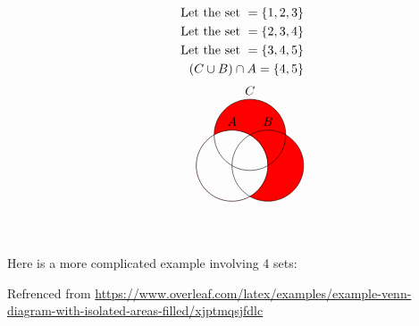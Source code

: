 \documentclass{article}
\def\exp{
    \begin{tikzpicture}
        \begin{scope} [fill opacity = .0]
            \draw[fill=green, draw = black] (-0.5,1) circle (1);
            \draw[fill=blue, draw = black] (0.5,1) circle (1);
            \draw[fill=red, draw = black] (0,0) circle (1);
            \node at (-0.9,1.4) {$\mathbf{A}$};
            \node at (0.9,1.4) {$\mathbf{B}$};
            \node at (0, -0.4) {$\mathbf{C}$};
        \end{scope}
    \end{tikzpicture}
}
\begin{document}
\begin{align*}
    \text{Let the set } = \{1, 2, 3\} \\
    \text{Let the set } = \{2, 3, 4\} \\
    \text{Let the set } = \{3, 4, 5\} \\
    (C \cup B) \cap A = \{4, 5\}      \\
    \begin{tikzpicture}[fill=red]
        \scope
        \clip (-2,-2) rectangle (2,2)
        (0,0) circle (1);
        \fill (0,0) circle (1);
        \endscope
        \scope
        \clip (-2,-2) rectangle (2,2)
        (0,0) circle (1);
        \fill (1,0) circle (1);
        \endscope
        \scope
        \clip (-2,-2) rectangle (2,2)
        (0,0) circle (1);
        \fill (0.5,0.866) circle (1);
        \endscope
        \draw (0,0) circle (1) (0,1)  node [text=black,above] {$A$}
        (1,0) circle (1) (1,1)  node [text=black,above] {$B$}
        (0.5,0.866) circle (1) (0.5,1.866)  node [text=black,above] {$C$};
    \end{tikzpicture}
\end{align*}



\pagebreak

Here is a more complicated example involving 4 sets:

Refrenced from \url{https://www.overleaf.com/latex/examples/example-venn-diagram-with-isolated-areas-filled/xjptmqsjfdlc}
\end{document}
